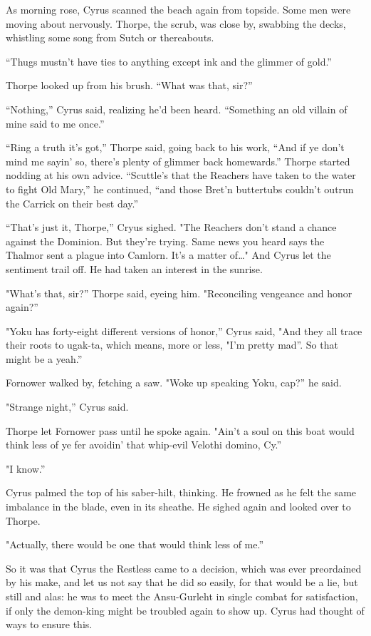 As morning rose, Cyrus scanned the beach again from topside. Some men were moving about nervously. Thorpe, the scrub, was close by, swabbing the decks, whistling some song from Sutch or thereabouts.

“Thugs mustn’t have ties to anything except ink and the glimmer of gold.”

Thorpe looked up from his brush. “What was that, sir?”

“Nothing,” Cyrus said, realizing he’d been heard. “Something an old villain of mine said to me once.”

“Ring a truth it’s got,” Thorpe said, going back to his work, “And if ye don’t mind me sayin’ so, there’s plenty of glimmer back homewards.” Thorpe started nodding at his own advice. “Scuttle’s that the Reachers have taken to the water to fight Old Mary,” he continued, “and those Bret’n buttertubs couldn’t outrun the Carrick on their best day.”

“That’s just it, Thorpe,” Cryus sighed. "The Reachers don’t stand a chance against the Dominion. But they’re trying. Same news you heard says the Thalmor sent a plague into Camlorn. It’s a matter of…" And Cyrus let the sentiment trail off. He had taken an interest in the sunrise.

"What’s that, sir?” Thorpe said, eyeing him. "Reconciling vengeance and honor again?”

"Yoku has forty-eight different versions of honor,” Cyrus said, "And they all trace their roots to ugak-ta, which means, more or less, "I’m pretty mad”. So that might be a yeah.”

Fornower walked by, fetching a saw. "Woke up speaking Yoku, cap?” he said.

"Strange night,” Cyrus said.

Thorpe let Fornower pass until he spoke again. "Ain’t a soul on this boat would think less of ye fer avoidin’ that whip-evil Velothi domino, Cy.”

"I know.”

Cyrus palmed the top of his saber-hilt, thinking. He frowned as he felt the same imbalance in the blade, even in its sheathe. He sighed again and looked over to Thorpe.

"Actually, there would be one that would think less of me.”

\parabreak

So it was that Cyrus the Restless came to a decision, which was ever preordained by his make, and let us not say that he did so easily, for that would be a lie, but still and alas: he was to meet the Ansu-Gurleht in single combat for satisfaction, if only the demon-king might be troubled again to show up. Cyrus had thought of ways to ensure this.

